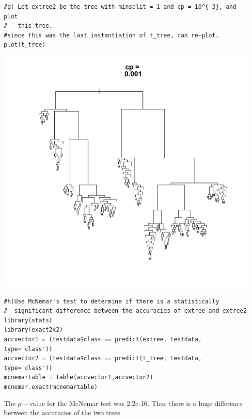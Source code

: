 \documentclass[11pt]{article}
\begin{document}
\begin{Verbatim}
#g) Let extree2 be the tree with minsplit = 1 and cp = 10^{-3}, and plot 
#   this tree.
#since this was the last instantiation of t_tree, can re-plot.
plot(t_tree)
\end{Verbatim}

\begin{center}
\includegraphics[scale=0.35]{images/ctrl11}
\end{center}

\begin{Verbatim}
#h)Use McNemar's test to determine if there is a statistically 
#  significant difference between the accuracies of extree and extree2
library(stats)
library(exact2x2)
accvector1 = (testdata$class == predict(extree, testdata, type='class'))
accvector2 = (testdata$class == predict(t_tree, testdata, type='class'))
mcnemartable = table(accvector1,accvector2)
mcnemar.exact(mcnemartable)

\end{Verbatim}
The $p-$value for the McNemar test was 2.2e-16. Thus there is a 
huge difference between the accuracies of the two trees.
\end{document}
